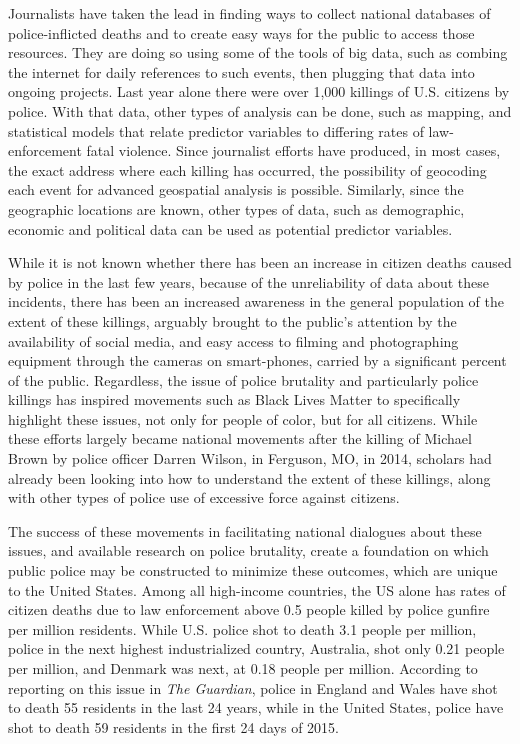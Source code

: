 \documentclass[sigconf]{acmart}
\begin{document}
Journalists have taken the lead in finding ways to collect national databases of police-inflicted deaths and to create easy ways for the public to access those resources. \cite{currie16,nix17,counted,fatalforce} They are doing so using some of the tools of big data, such as combing the internet for daily references to such events, then plugging that data into ongoing projects.  Last year alone there were over 1,000 killings of U.S. citizens by police. \cite{counted}  With that data, other types of analysis can be done, such as mapping, and statistical models that relate predictor variables to differing rates of law-enforcement fatal violence.  Since journalist efforts have produced, in most cases, the exact address where each killing has occurred, the possibility of geocoding each event for advanced geospatial analysis is possible. \cite{dalton17}  Similarly, since the geographic locations are known, other types of data, such as demographic, economic and political data can be used as potential predictor variables. \cite{smith04,legewie15}

While it is not known whether there has been an increase in citizen deaths caused by police in the last few  years, because of the unreliability of data about these incidents, there has been an increased awareness in the general population of the extent of these killings, arguably brought to the public's attention by the availability of social media, and easy access to filming and photographing equipment through the cameras on smart-phones, carried by a significant percent of the public. \cite{bonilla15,brucato15,nix17}  Regardless, the issue of police brutality and particularly police killings has inspired movements such as Black Lives Matter to specifically highlight these issues, not only for people of color, but for all citizens.  While these efforts largely became national movements after the killing of Michael Brown by police officer Darren Wilson, in Ferguson, MO, in 2014, scholars had already been looking into how to understand the extent of these killings, along with other types of police use of excessive force against citizens. \cite{smith04,smith14,meeks06,schneider14,chaney13,holmes00}  

The success of these movements in facilitating national dialogues about these issues, and available research on police brutality, create a foundation on which public police may be constructed to minimize these outcomes, which are unique to the United States. Among all high-income countries, the US alone has rates of citizen deaths due to law enforcement above 0.5 people killed by police gunfire per million residents.  While U.S. police shot to death 3.1 people per million, police in the next highest industrialized country, Australia, shot only 0.21 people per million, and Denmark was next, at 0.18 people per million.  \cite{ser16}  According to reporting on this issue in {\em The Guardian}, police in England and Wales have shot to death 55 residents in the last 24 years, while in the United States, police have shot to death 59 residents in the first 24 days of 2015. \cite{lartey15} 
\end{document}
